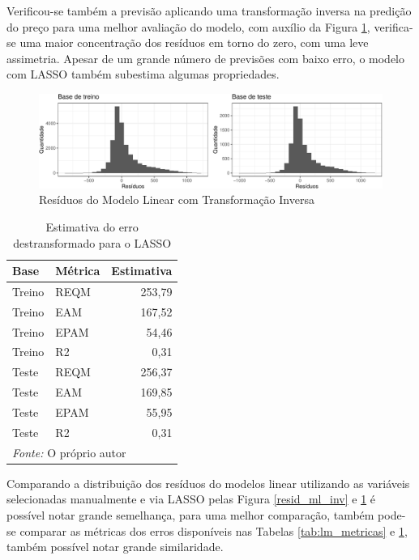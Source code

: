 \documentclass[
	12pt,				%
	a4paper,		%
	oneside,    %
	chapter=TITLE,		   %
	section=TITLE,		   %
	subsection=TITLE,	   %
	subsubsection=TITLE, %
	english,			%
	french,				%
	spanish,			%
	brazil,				%
]{abntex2}
\begin{document}
Verificou-se também a previsão aplicando uma transformação inversa na
predição do preço para uma melhor avaliação do modelo, com auxílio da
Figura \ref{resid_lasso_inv}, verifica-se uma maior concentração dos
resíduos em torno do zero, com uma leve assimetria. Apesar de um grande
número de previsões com baixo erro, o modelo com LASSO também subestima
algumas propriedades.

\begin{figure}
\centering
\includegraphics{00-TCC_files/figure-latex/resid_lasso_inv-1.pdf}
\caption{\label{resid_lasso_inv}Resíduos do Modelo Linear com
Transformação Inversa}
\end{figure}

\begin{table}

\caption{\label{tab:lasso_metricas}Estimativa do erro destransformado para o LASSO}
\centering
\begin{tabular}[t]{l|l|r}
\hline
Base & Métrica & Estimativa\\
\hline
Treino & REQM & 253,79\\
\hline
Treino & EAM & 167,52\\
\hline
Treino & EPAM & 54,46\\
\hline
Treino & R2 & 0,31\\
\hline
Teste & REQM & 256,37\\
\hline
Teste & EAM & 169,85\\
\hline
Teste & EPAM & 55,95\\
\hline
Teste & R2 & 0,31\\
\hline
\multicolumn{3}{l}{\textit{Fonte: } O próprio autor}\\
\end{tabular}
\end{table}

Comparando a distribuição dos resíduos do modelos linear utilizando as
variáveis selecionadas manualmente e via LASSO pelas Figura
\ref{resid_ml_inv} e \ref{resid_lasso_inv} é possível notar grande
semelhança, para uma melhor comparação, também pode-se comparar as
métricas dos erros disponíveis nas Tabelas \ref{tab:lm_metricas} e
\ref{tab:lasso_metricas}, também possível notar grande similaridade.
\end{document}

